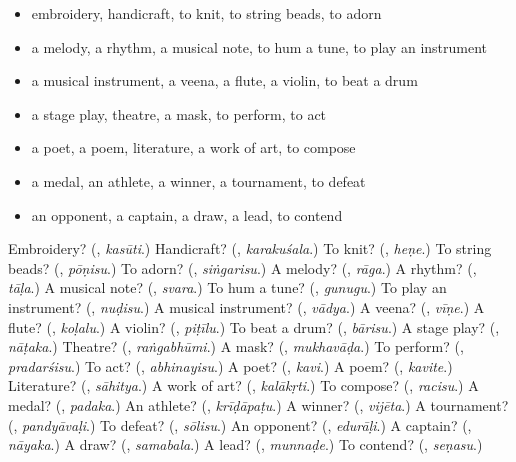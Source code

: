 \begin{itemize}
\raggedright
  \item embroidery, handicraft, to knit, to string beads, to adorn
  \item a melody, a rhythm, a musical note, to hum a tune, to play an instrument
  \item a musical instrument, a veena, a flute, a violin, to beat a drum
  \item a stage play, theatre, a mask, to perform, to act
  \item a poet, a poem, literature, a work of art, to compose
  \item a medal, an athlete, a winner, a tournament, to defeat
  \item an opponent, a captain, a draw, a lead, to contend
\end{itemize}

\begin{tcolorbox}[breakable,colback=teal!4,colframe=teal!35!black,title={Before you move on}]
Embroidery? (\textbf{}, \emph{kasūti}.) Handicraft? (\textbf{}, \emph{karakuśala}.) To knit? (\textbf{}, \emph{heṇe}.) To string beads? (\textbf{}, \emph{pōṇisu}.) To adorn? (\textbf{}, \emph{siṅgarisu}.) A melody? (\textbf{}, \emph{rāga}.) A rhythm? (\textbf{}, \emph{tāḷa}.) A musical note? (\textbf{}, \emph{svara}.) To hum a tune? (\textbf{}, \emph{gunugu}.) To play an instrument? (\textbf{}, \emph{nuḍisu}.) A musical instrument? (\textbf{}, \emph{vādya}.) A veena? (\textbf{}, \emph{vīṇe}.) A flute? (\textbf{}, \emph{koḷalu}.) A violin? (\textbf{}, \emph{piṭīlu}.) To beat a drum? (\textbf{}, \emph{bārisu}.) A stage play? (\textbf{}, \emph{nāṭaka}.) Theatre? (\textbf{}, \emph{raṅgabhūmi}.) A mask? (\textbf{}, \emph{mukhavāḍa}.) To perform? (\textbf{}, \emph{pradarśisu}.) To act? (\textbf{}, \emph{abhinayisu}.) A poet? (\textbf{}, \emph{kavi}.) A poem? (\textbf{}, \emph{kavite}.) Literature? (\textbf{}, \emph{sāhitya}.) A work of art? (\textbf{}, \emph{kalākṛti}.) To compose? (\textbf{}, \emph{racisu}.) A medal? (\textbf{}, \emph{padaka}.) An athlete? (\textbf{}, \emph{krīḍāpaṭu}.) A winner? (\textbf{}, \emph{vijēta}.) A tournament? (\textbf{}, \emph{pandyāvaḷi}.) To defeat? (\textbf{}, \emph{sōlisu}.) An opponent? (\textbf{}, \emph{edurāḷi}.) A captain? (\textbf{}, \emph{nāyaka}.) A draw? (\textbf{}, \emph{samabala}.) A lead? (\textbf{}, \emph{munnaḍe}.) To contend? (\textbf{}, \emph{seṇasu}.)
\end{tcolorbox}
